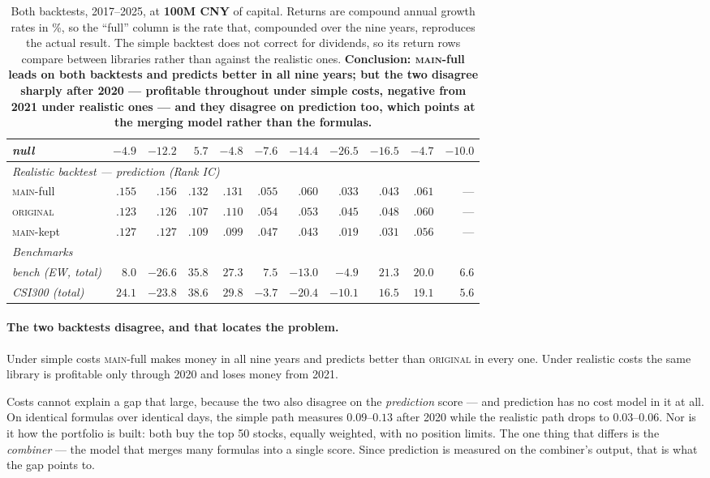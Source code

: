 \documentclass[11pt]{article}
\newcommand{\main}{\textsc{main}}
\newcommand{\orig}{\textsc{original}}
\begin{document}
\begin{table}[h]
\begin{tabular}{lrrrrrrrrrr}
\emph{null}  & $-4.9$ & $-12.2$ & $5.7$ & $-4.8$ & $-7.6$ & $-14.4$ & $-26.5$ & $-16.5$ & $-4.7$ & $-10.0$ \\
\midrule
\multicolumn{11}{l}{\emph{Realistic backtest --- prediction (Rank IC)}} \\
\main{}-full & $\bm{.155}$ & $\bm{.156}$ & $\bm{.132}$ & $\bm{.131}$ & $\bm{.055}$ & $\bm{.060}$ & $.033$ & $.043$ & $\bm{.061}$ & --- \\
\orig{}      & $.123$ & $.126$ & $.107$ & $.110$ & $.054$ & $.053$ & $\bm{.045}$ & $\bm{.048}$ & $.060$ & --- \\
\main{}-kept  & $.127$ & $.127$ & $.109$ & $.099$ & $.047$ & $.043$ & $.019$ & $.031$ & $.056$ & --- \\
\midrule
\multicolumn{11}{l}{\emph{Benchmarks}} \\
\emph{bench (EW, total)} & $8.0$ & $-26.6$ & $35.8$ & $27.3$ & $7.5$ & $-13.0$ & $-4.9$ & $21.3$ & $20.0$ & $6.6$ \\
\emph{CSI300 (total)}    & $24.1$ & $-23.8$ & $38.6$ & $29.8$ & $-3.7$ & $-20.4$ & $-10.1$ & $16.5$ & $19.1$ & $5.6$ \\
\bottomrule
\end{tabular}
\caption{Both backtests, 2017--2025, at \textbf{100M CNY} of capital. Returns are
compound annual growth rates in \%, so the ``full'' column is the rate that, compounded
over the nine years, reproduces the actual result. The simple backtest does not correct
for dividends, so its return rows compare between libraries rather than against the
realistic ones. \textbf{Conclusion: \main{}-full leads on both backtests and predicts
better in all nine years; but the two disagree sharply after 2020 --- profitable
throughout under simple costs, negative from 2021 under realistic ones --- and they
disagree on prediction too, which points at the merging model rather than the
formulas.}}
\label{tab:long}
\end{table}

\paragraph{The two backtests disagree, and that locates the problem.}
Under simple costs \main{}-full makes money in all nine years and predicts better than
\orig{} in every one. Under realistic costs the same library is profitable only
through 2020 and loses money from 2021.

Costs cannot explain a gap that large, because the two also disagree on the
\emph{prediction} score --- and prediction has no cost model in it at all. On
identical formulas over identical days, the simple path measures $0.09$--$0.13$ after
2020 while the realistic path drops to $0.03$--$0.06$. Nor is it how the portfolio is
built: both buy the top 50 stocks, equally weighted, with no position limits. The one
thing that differs is the \emph{combiner} --- the model that merges many formulas into
a single score. Since prediction is measured on the combiner's output, that is what
the gap points to.
\end{document}
